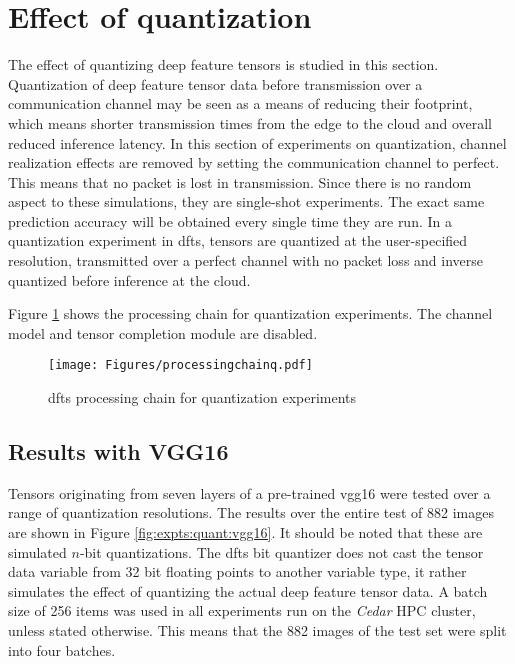 \section{Effect of quantization} \label{sec:expts:quant}
The effect of quantizing deep feature tensors is studied in this section. Quantization of deep feature tensor data before transmission over a communication channel may be seen as a means of reducing their footprint, which means shorter transmission times from the edge to the cloud and overall reduced inference latency. In this section of experiments on quantization, channel realization effects are removed by setting the communication channel to perfect. This means that no packet is lost in transmission. Since there is no random aspect to these simulations, they are single-shot experiments. The exact same prediction accuracy will be obtained every single time they are run. In a quantization experiment in \gls{dfts}, tensors are quantized at the user-specified resolution, transmitted over a perfect channel with no packet loss and inverse quantized before inference at the cloud.

Figure \ref{fig:expt:chainq} shows the processing chain for quantization experiments. The channel model and tensor completion module are disabled.

\begin{figure}[H]
	\centering
	\texttt{[image: Figures/processingchainq.pdf]}
	\caption{\gls{dfts} processing chain for quantization experiments}
	\label{fig:expt:chainq}
\end{figure}

\subsection{Results with VGG16} \label{subsec:expts:quant:vgg16}
Tensors originating from seven layers of a pre-trained \gls{vgg16} were tested over a range of quantization resolutions. The results over the entire test of 882 images are shown in Figure \ref{fig:expts:quant:vgg16}. It should be noted that these are simulated $n$-bit quantizations. The \gls{dfts} bit quantizer does not cast the tensor data variable from 32 bit floating points to another variable type, it rather simulates the effect of quantizing the actual deep feature tensor data. A batch size of 256 items was used in all experiments run on the \textit{Cedar} HPC cluster, unless stated otherwise. This means that the 882 images of the test set were split into four batches.

